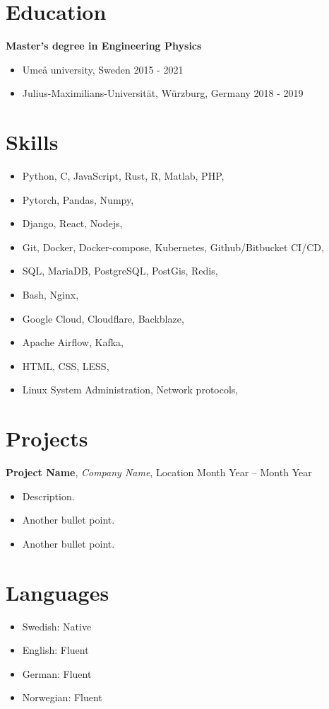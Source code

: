 \documentclass[11pt, a4paper]{article}
\begin{document}
\section*{Education}
\textbf{Master's degree in Engineering Physics}
\begin{itemize}[noitemsep]
    \item Umeå university, Sweden \hfill 2015 - 2021
    \item Julius-Maximilians-Universität, Würzburg, Germany \hfill 2018 - 2019
\end{itemize}

\section*{Skills}
\begin{itemize}[noitemsep]
    \item Python, C, JavaScript, Rust, R, Matlab, PHP, 
    \item Pytorch, Pandas, Numpy,
    \item Django, React, Nodejs, 
    \item Git, Docker, Docker-compose, Kubernetes, Github/Bitbucket CI/CD,
    \item SQL, MariaDB, PostgreSQL, PostGis, Redis,
    \item Bash, Nginx,
    \item Google Cloud, Cloudflare, Backblaze,
    \item Apache Airflow, Kafka,
    \item HTML, CSS, LESS, 
    \item Linux System Administration, Network protocols,
\end{itemize}

\section*{Projects}
\textbf{Project Name}, \textit{Company Name}, Location \hfill Month Year – Month Year
\begin{itemize}[noitemsep]
    \item Description.
    \item Another bullet point.
    \item Another bullet point.
\end{itemize}

\section*{Languages}
\begin{itemize}[noitemsep]
    \item Swedish: Native
    \item English: Fluent
    \item German: Fluent
    \item Norwegian: Fluent
\end{itemize}
\end{document}

